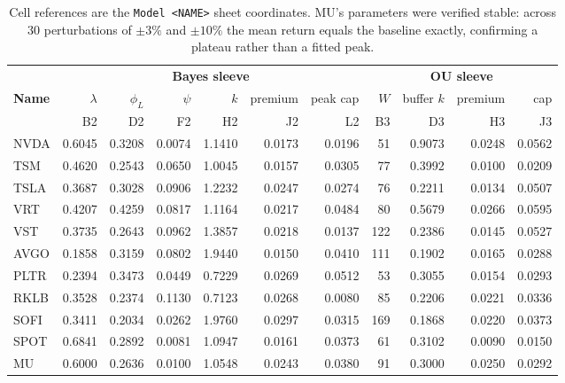 \documentclass[11pt]{article}
\begin{document}
\begin{table}[H]\centering\footnotesize
\renewcommand{\arraystretch}{1.12}
\setlength{\tabcolsep}{4pt}
\begin{tabular}{l rrr rrr r rrr}
\toprule
& \multicolumn{6}{c}{\textbf{Bayes sleeve}} & \multicolumn{4}{c}{\textbf{OU sleeve}}\\
\cmidrule(lr){2-7}\cmidrule(lr){8-11}
\textbf{Name} & $\lambda$ & $\phi_L$ & $\psi$ & $k$ & premium & peak cap & $W$ & buffer $k$ & premium & cap\\
& \tiny B2 & \tiny D2 & \tiny F2 & \tiny H2 & \tiny J2 & \tiny L2 & \tiny B3 & \tiny D3 & \tiny H3 & \tiny J3\\
\midrule
NVDA & 0.6045 & 0.3208 & 0.0074 & 1.1410 & 0.0173 & 0.0196 & 51  & 0.9073 & 0.0248 & 0.0562\\
TSM  & 0.4620 & 0.2543 & 0.0650 & 1.0045 & 0.0157 & 0.0305 & 77  & 0.3992 & 0.0100 & 0.0209\\
TSLA & 0.3687 & 0.3028 & 0.0906 & 1.2232 & 0.0247 & 0.0274 & 76  & 0.2211 & 0.0134 & 0.0507\\
VRT  & 0.4207 & 0.4259 & 0.0817 & 1.1164 & 0.0217 & 0.0484 & 80  & 0.5679 & 0.0266 & 0.0595\\
VST  & 0.3735 & 0.2643 & 0.0962 & 1.3857 & 0.0218 & 0.0137 & 122 & 0.2386 & 0.0145 & 0.0527\\
AVGO & 0.1858 & 0.3159 & 0.0802 & 1.9440 & 0.0150 & 0.0410 & 111 & 0.1902 & 0.0165 & 0.0288\\
PLTR & 0.2394 & 0.3473 & 0.0449 & 0.7229 & 0.0269 & 0.0512 & 53  & 0.3055 & 0.0154 & 0.0293\\
RKLB & 0.3528 & 0.2374 & 0.1130 & 0.7123 & 0.0268 & 0.0080 & 85  & 0.2206 & 0.0221 & 0.0336\\
SOFI & 0.3411 & 0.2034 & 0.0262 & 1.9760 & 0.0297 & 0.0315 & 169 & 0.1868 & 0.0220 & 0.0373\\
SPOT & 0.6841 & 0.2892 & 0.0081 & 1.0947 & 0.0161 & 0.0373 & 61  & 0.3102 & 0.0090 & 0.0150\\
\rowcolor{bckeep} MU & 0.6000 & 0.2636 & 0.0100 & 1.0548 & 0.0243 & 0.0380 & 91 & 0.3000 & 0.0250 & 0.0292\\
\bottomrule
\end{tabular}
\caption*{\footnotesize Cell references are the \texttt{Model <NAME>} sheet coordinates. MU's
parameters were verified stable: across $30$ perturbations of $\pm3\%$ and $\pm10\%$ the mean
return equals the baseline exactly, confirming a plateau rather than a fitted peak.}
\end{table}
\end{document}
